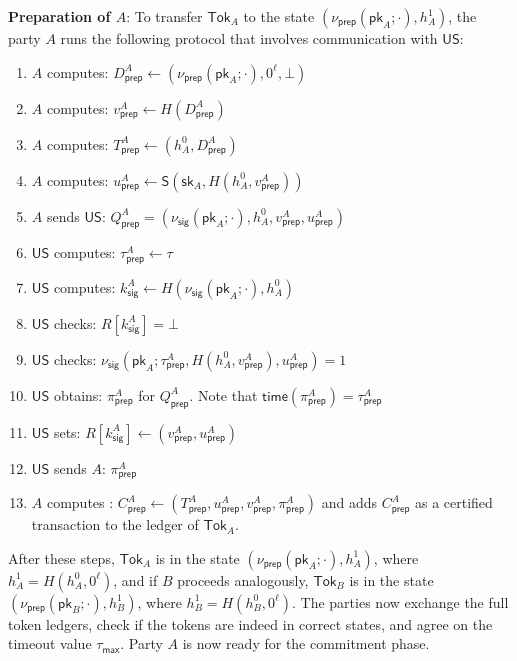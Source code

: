 \documentclass{article}
\newcommand{\sig}[0]{\mathsf{S}}
\newcommand{\pubkey}[0]{\mathsf{pk}}
\newcommand{\prikey}[0]{\mathsf{sk}}
\newcommand{\unisrv}[0]{\mathsf{US}}
\begin{document}
\noindent\textbf{Preparation of $A$}: To transfer $\mathsf{Tok}_A$ to the state $(\nu_\mathsf{prep}(\pubkey_A;\cdot),h^1_A)$, the party $A$ runs the following protocol that involves communication with $\unisrv$:
\begin{enumerate}
    \item $A$ computes: $D^A_\mathsf{prep}\gets (\nu_\mathsf{prep}(\pubkey_A;\cdot), 0^\ell,\bot)$
    \item $A$ computes: $v^A_\mathsf{prep}\gets H(D^A_\mathsf{prep})$
    \item $A$ computes: $T^A_\mathsf{prep}\gets (h^0_A, D^A_\mathsf{prep})$
    \item $A$ computes: $u^A_\mathsf{prep}\gets \sig(\prikey_A,H(h^0_A,v^A_\mathsf{prep}))$
    \item $A$ sends $\unisrv$: $Q^A_\mathsf{prep}=(\nu_\mathsf{sig}(\pubkey_A;\cdot),h^0_A,v^A_\mathsf{prep},u^A_\mathsf{prep})$
    \item $\unisrv$ computes: $\tau^A_\mathsf{prep}\gets \tau$
    \item $\unisrv$ computes: $k^A_\mathsf{sig}\gets H(\nu_\mathsf{sig}(\pubkey_A;\cdot),h^0_A)$
    \item $\unisrv$ checks: $R[k^A_\mathsf{sig}]=\bot$
    \item $\unisrv$ checks: $\nu_\mathsf{sig}(\pubkey_A;\tau^A_\mathsf{prep},H(h^0_A,v^A_\mathsf{prep}),u^A_\mathsf{prep})=1$
    \item $\unisrv$ obtains: $\pi^A_\mathsf{prep}$ for $Q^A_\mathsf{prep}$. Note that $\mathsf{time}(\pi^A_\mathsf{prep})=\tau^A_\mathsf{prep}$
    \item $\unisrv$ sets: $R[k^A_\mathsf{sig}]\gets (v^A_\mathsf{prep},u^A_\mathsf{prep})$
    \item $\unisrv$ sends $A$: $\pi^A_\mathsf{prep}$
    \item $A$ computes : $C^A_\mathsf{prep}\gets (T^A_\mathsf{prep},u^A_\mathsf{prep},v^A_\mathsf{prep},\pi^A_\mathsf{prep})$ and adds $C^A_\mathsf{prep}$ as a certified transaction to the ledger of $\mathsf{Tok}_A$.
\end{enumerate}
After these steps, $\mathsf{Tok}_A$ is in the state $(\nu_\mathsf{prep}(\pubkey_A;\cdot),h^1_A)$, where $h^1_A=H(h^0_A,0^\ell)$, and if
$B$ proceeds analogously, $\mathsf{Tok}_B$ is in the state $(\nu_\mathsf{prep}(\pubkey_B;\cdot),h^1_B)$, where $h^1_B=H(h^0_B,0^\ell)$. The parties now exchange the full token ledgers, check if the tokens are indeed in correct states, and agree on the timeout value $\tau_\mathsf{max}$. Party $A$ is now ready for the commitment phase. \medskip
\end{document}
